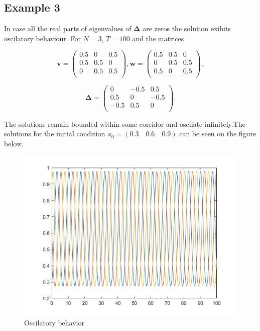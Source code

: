 \documentclass[a4paper,10pt, english]{article}
\begin{document}
\subsection{Example 3}
In case all the real parts of eigenvalues of $\mathbf{\Delta}$ are zeros the solution exibits oscilatory behaviour. For $N=3$, $T=100$ and the matrices

\[\mathbf{v} =  \left( \begin{array}{ccc}
 0.5 & 0   & 0.5 \\
 0.5 & 0.5 & 0   \\
 0   & 0.5 & 0.5 \\
\end{array} \right),
%
\mathbf{w} = 
\left( \begin{array}{ccc}
0.5 & 0.5 & 0\\ 
0  & 0.5 & 0.5\\
0.5 & 0 & 0.5\\
\end{array} \right),
\]

$$
\mathbf{\Delta} = 
\left(
\begin{matrix}
0   & -0.5 & 0.5 \\
0.5 &  0 & -0.5 \\
-0.5 &  0.5 & 0 \\
\end{matrix}
\right).
$$


The solutions remain bounded within some corridor and oscilate infinitely.The solutions for the initial condition $x_0 = (0.3\quad 0.6\quad 0.9)$ can be seen on the figure below. 

\begin{figure}[ht]
\label{fig_osc}
\centering
\includegraphics[scale= 0.4]{osc.jpg}
\caption{Oscilatory behavior}
\end{figure}
\end{document}

